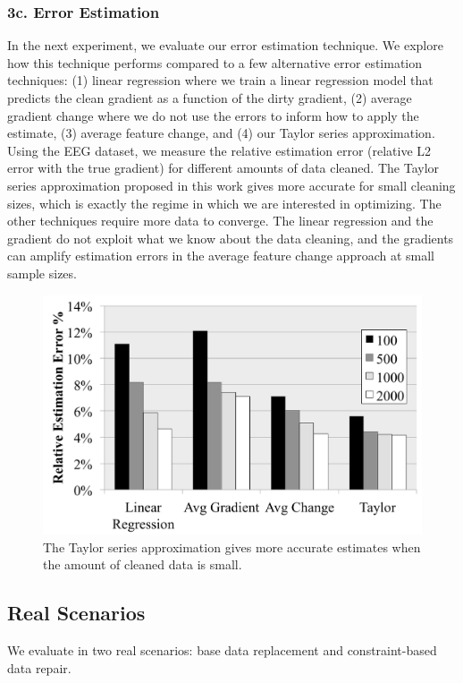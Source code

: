 \subsubsection{3c. Error Estimation}\label{est}
In the next experiment, we evaluate our error estimation technique.
We explore how this technique performs compared to a few alternative error estimation techniques: (1) linear regression where we train a linear regression model that predicts the clean gradient as a function of the dirty gradient, (2) average gradient change where we do not use the errors to inform how to apply the estimate, (3) average feature change, and (4) our Taylor series approximation.
Using the EEG dataset, we measure the relative estimation error (relative L2 error with the true gradient) for different amounts of data cleaned.
The Taylor series approximation proposed in this work gives more accurate for small cleaning sizes, which is exactly the regime in which we are interested in optimizing.
The other techniques require more data to converge.
The linear regression and the gradient do not exploit what we know about the data cleaning, and the gradients can amplify estimation errors in the average feature change approach at small sample sizes.

\begin{figure}[ht!]
\centering
 \includegraphics[width=\columnwidth]{exp/exp12.pdf}
 \caption{The Taylor series approximation gives more accurate estimates when the amount of cleaned data is small. \label{tradeoffs3}}
\end{figure}

\subsection{Real Scenarios}
We evaluate \sys in two real scenarios: base data replacement and constraint-based data repair.

